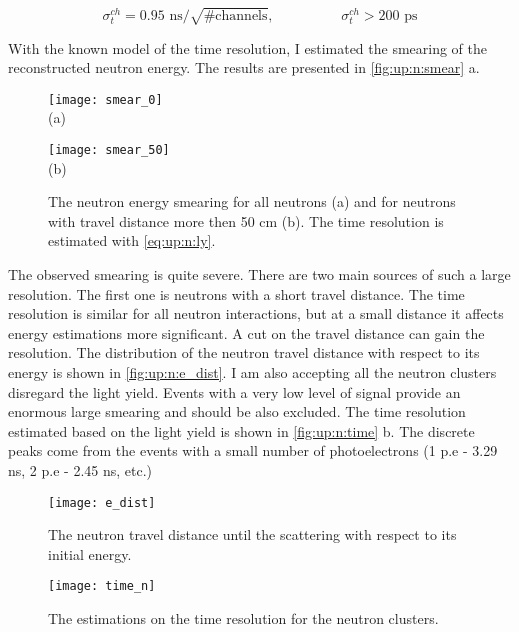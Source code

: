 \documentclass[main.tex]{subfiles}
\begin{document}
\begin{equation}
\label{eq:up:n:ch}
	\sigma^{ch}_t=0.95\text{ ns}/\sqrt{\text{\#channels}}, \hspace{2cm} \sigma^{ch}_t>200\text{ ps}
\end{equation}

With the known model of the time resolution, I estimated the smearing of the reconstructed neutron energy. The results are presented in \autoref{fig:up:n:smear} a.

\begin{figure}[!ht]
	\centering
	\begin{minipage}{0.49\linewidth}
		\centering
		\texttt{[image: smear\_0]} \\ (a)
	\end{minipage}
	\begin{minipage}{0.49\linewidth}
		\centering
		\texttt{[image: smear\_50]} \\ (b)
	\end{minipage}
	\caption{The neutron energy smearing for all neutrons (a) and for neutrons with travel distance more then 50 cm (b). The time resolution is estimated with \autoref{eq:up:n:ly}.}
	\label{fig:up:n:smear}
\end{figure}

The observed smearing is quite severe. There are two main sources of such a large resolution. The first one is neutrons with a short travel distance. The time resolution is similar for all neutron interactions, but at a small distance it affects energy estimations more significant. A cut on the travel distance can gain the resolution. The distribution of the neutron travel distance with respect to its energy is shown in \autoref{fig:up:n:e_dist}. I am also accepting all the neutron clusters disregard the light yield. Events with a very low level of signal provide an enormous large smearing and should be also excluded. The time resolution estimated based on the light yield is shown in \autoref{fig:up:n:time} b. The discrete peaks come from the events with a small number of photoelectrons (1 p.e - 3.29 ns, 2 p.e - 2.45 ns, etc.)

\begin{figure}[!ht]
	\centering
	\begin{minipage}{0.4\linewidth}
		\centering
		\texttt{[image: e\_dist]}
    \caption{The neutron travel distance until the scattering with respect to its initial energy.}
    \label{fig:up:n:e_dist}
	\end{minipage}
	\begin{minipage}{0.19\linewidth}
	\hspace{\linewidth}
	\end{minipage}
	\begin{minipage}{0.4\linewidth}
		\centering
		\texttt{[image: time\_n]}
    \caption{The estimations on the time resolution for the neutron clusters.}
    \label{fig:up:n:time}
	\end{minipage}
\end{figure}
\end{document}
